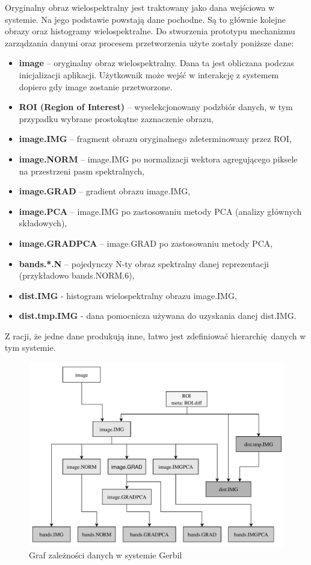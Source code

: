 Oryginalny obraz wielospektralny jest traktowany jako dana wejściowa w systemie. Na jego podstawie powstają dane pochodne. Są to głównie kolejne obrazy oraz histogramy wielospektralne. Do stworzenia prototypu mechanizmu zarządzania danymi oraz procesem przetworzenia użyte zostały poniższe dane:
\begin{itemize}
	\item {} \textbf{image} -- oryginalny obraz wielospektralny. Dana ta jest obliczana podczas inicjalizacji aplikacji. Użytkownik może wejść w interakcję z systemem dopiero gdy image zostanie przetworzone.
	\item {} \textbf{ROI (Region of Interest)} -- wyselekcjonowany podzbiór danych, w tym przypadku wybrane prostokątne zaznaczenie obrazu,
	\item {} \textbf{image.IMG} -- fragment obrazu oryginalnego zdeterminowany przez ROI,
	\item {} \textbf{image.NORM} -- image.IMG po normalizacji wektora agregującego piksele na przestrzeni pasm spektralnych,
	\item {} \textbf{image.GRAD} -- gradient obrazu image.IMG,
	\item {} \textbf{image.PCA} -- image.IMG po zastosowaniu metody PCA (analizy głównych składowych),
	\item {} \textbf{image.GRADPCA} -- image.GRAD po zastosowaniu metody PCA,
	\item {} \textbf{bands.*.N} -- pojedynczy N-ty obraz spektralny danej reprezentacji (przykładowo bands.NORM.6),
	\item {} \textbf{dist.IMG} - histogram wielospektralny obrazu image.IMG,
	\item {} \textbf{dist.tmp.IMG} - dana pomocnicza używana do uzyskania danej dist.IMG. 
\end{itemize}
Z racji, że jedne dane produkują inne, łatwo jest zdefiniować hierarchię danych w tym systemie.

\begin{figure}[ht]
	\centering
		\includegraphics[width=0.7\linewidth]{rys02/data-dependencies}
	\caption{Graf zależności danych w systemie Gerbil}
	\label{fig:data-dependencies}	
\end{figure}

